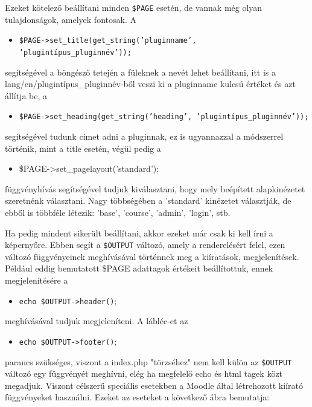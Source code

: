 Ezeket kötelező beállítani minden \texttt{\$PAGE} esetén, de vannak még olyan tulajdonságok, amelyek fontosak. A
\begin{itemize}
    \item[] \texttt{\$PAGE->set\_title(get\_string('pluginname', 'plugintípus\_pluginnév'));}
\end{itemize}

segítségével a böngésző tetején a füleknek a nevét lehet beállítani, itt is a \break lang/en/plugintípus\_pluginnév-ből veszi ki a pluginname kulcsú értéket és azt állítja be, a 
\begin{itemize}
    \item[] \texttt{\$PAGE->set\_heading(get\_string('heading', 'plugintípus\_pluginnév'));}
\end{itemize}
segítségével tudunk címet adni a pluginnak, ez is ugyannazzal a módszerrel történik, mint a title esetén, végül pedig a
\begin{itemize}
    \item[] \$PAGE->set\_pagelayout('standard');
\end{itemize}
függvényhívás segítségével tudjuk kiválasztani, hogy mely beépített alapkinézetet szeretnénk választani. Nagy többségében a 'standard' kinézetet választják, de ebből is többféle létezik: 'base', 'course', 'admin', 'login', stb. \par

Ha pedig mindent sikerült beállítani, akkor ezeket már csak ki kell írni a képernyőre. Ebben segít a \texttt{\$OUTPUT} változó, amely a renderelésért felel, ezen változó függvényeinek meghívásával történnek meg a kiíratások, megjelenítések. Például eddig bemutatott \$PAGE adattagok értékeit beállítottuk, ennek megjelenítésére a 
\begin{itemize}
    \item[] \texttt{echo \$OUTPUT->header()};
\end{itemize}
meghívásával tudjuk megjeleníteni. A lábléc-et az
\begin{itemize}
    \item[] \texttt{echo \$OUTPUT->footer()};
\end{itemize}
parancs szükséges, viszont a index.php "törzséhez" nem kell külön az \texttt{\$OUTPUT} változó egy függvényét meghívni, elég ha megfelelő echo és html tagek közt megadjuk. Viszont célszerű speciális esetekben a Moodle által létrehozott kiírató függvényeket használni. Ezeket az eseteket a következő ábra bemutatja:

